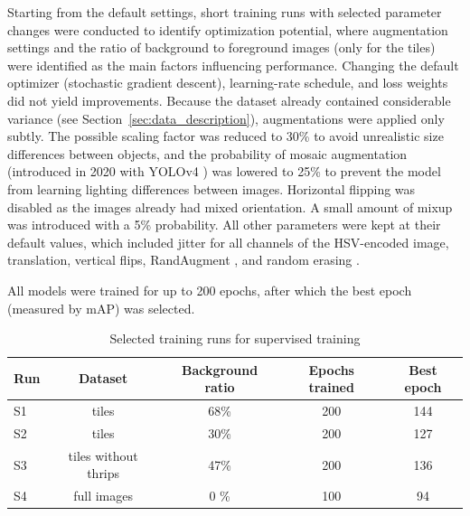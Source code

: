 \documentclass[12pt, a4paper]{article}
\begin{document}
Starting from the default settings, short training runs with selected parameter changes were conducted to identify optimization potential, where augmentation settings and the ratio of background to foreground images (only for the tiles) were identified as the main factors influencing performance. Changing the default optimizer (stochastic gradient descent), learning-rate schedule, and loss weights did not yield improvements. Because the dataset already contained considerable variance (see Section~\ref{sec:data_description}), augmentations were applied only subtly. The possible scaling factor was reduced to 30\% to avoid unrealistic size differences between objects, and the probability of mosaic augmentation (introduced in 2020 with YOLOv4 \cite{bochkovskiy2020yolov4}) was lowered to 25\% to prevent the model from learning lighting differences between images. Horizontal flipping was disabled as the images already had mixed orientation. A small amount of mixup \cite{zhang2018mixup} was introduced with a 5\% probability. All other parameters were kept at their default values, which included jitter for all channels of the HSV-encoded image, translation, vertical flips, RandAugment \cite{cubuk2020randaugment}, and random erasing \cite{zhong2020random}.

All models were trained for up to 200 epochs, after which the best epoch (measured by mAP) was selected.

\begin{table}[!t]
\centering
\begin{tabular}{lcccc}
\hline
\textbf{Run} & \textbf{Dataset} & \textbf{Background ratio} & \textbf{Epochs trained} & \textbf{Best epoch} \\
\hline
S1      & tiles                 & 68\%  & 200   &   144 \\
S2      & tiles                 & 30\%  & 200   & 127 \\
S3      & tiles without thrips  & 47\%  & 200 &136 \\
S4      & full images           & 0 \%  & 100 &94 \\

\hline
\end{tabular}
\caption{Selected training runs for supervised training}
\label{tab:train_params}
\end{table}
\end{document}
